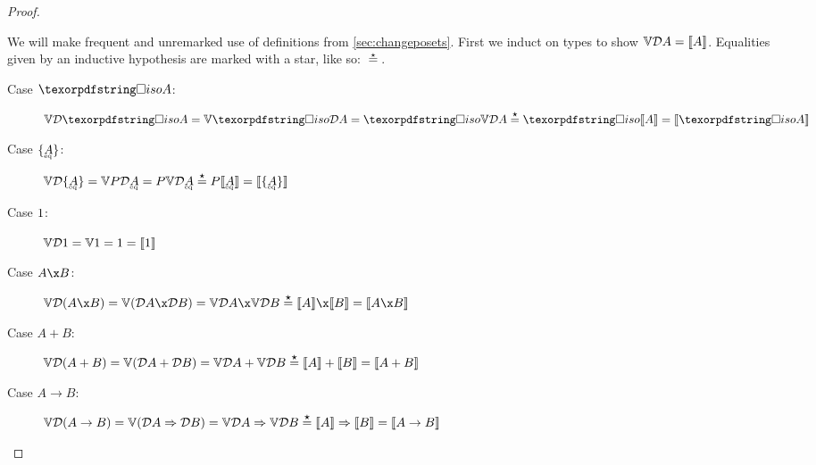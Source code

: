 \documentclass{rntz}\usepackage{fantasy}%
\begin{document}

\thmForget*
\begin{proof}\label{proof:forget}

  We will make frequent and unremarked use of definitions from
  \cref{sec:changeposets}. First we induct on types to show $\mathbb{V}{\mathcal{D} A} =
  \llbracket{A}\rrbracket$. Equalities given by an inductive hypothesis are marked with a star,
  like so: $\stareq$.

  \begin{description}
    \item[Case $\isof A$:] \(\vals{\incdens{\isof A}}
      = \vals{\discof{\incdens A}}
      = \isof{\vals{\incdens A}} \stareq \isof{\den A}
      = \den{\isof A} \)


    \item[Case $\tset{\eqt A}$:]
      \(\vals{\incdens{\tset{\eqt A}}}
      = \vals{\pfinof{\incdens{\eqt A}}}
      = \pfinof{\vals{\incdens{\eqt A}}}
      \stareq \pfinof{\den{\eqt A}}
      = \den{\tset{\eqt A}} \)


    \item[Case $1$:] \(\mathbb{V}{\mathcal{D} 1} = \mathbb{V}1 = 1 = \llbracket{1}\rrbracket\)

    \item[Case $A \x B$:] \(\vals{\incden{A \x B}}
      = \vals{(\incdens A \x \incdens B)}
      = \vals{\incdens A} \x \vals{\incdens B}
      \stareq \den{A} \x \den{B}
      = \den{A \x B} \)

    \item[Case $A + B$:] \(\mathbb{V}{\mathcal{D}({A + B})}
      = \mathbb{V}{(\mathcal{D} A + \mathcal{D} B)}
      = \mathbb{V}{\mathcal{D} A} + \mathbb{V}{\mathcal{D} B}
      \overset{\boldsymbol\star}{=} \llbracket{A}\rrbracket + \llbracket{B}\rrbracket
      = \llbracket{A + B}\rrbracket
      \)

    \item[Case $A \to B$:] \(\mathbb{V}{\mathcal{D}({A \to B})}
      = \mathbb{V}{(\mathcal{D} A \Rightarrow \mathcal{D} B)}
      = \mathbb{V}\mathcal{D} A \Rightarrow \mathbb{V}\mathcal{D} B
      \overset{\boldsymbol\star}{=} \llbracket{A}\rrbracket \Rightarrow \llbracket{B}\rrbracket
      = \llbracket{A \to B}\rrbracket
      \)
  \end{description}


\end{proof}
\end{document}
